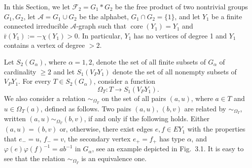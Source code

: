 \documentclass[10pt, reqno]{amsart}
\numberwithin{equation}{section}
\begin{document}
In this Section, we  let ${\mathcal{F}}_2 = G_1 * G_2$ be the free product of two nontrivial  groups  $G_1, G_2$, let
${\mathcal{A}} = G_1 \cup G_2$ be the alphabet,  $G_1 \cap G_2 = \{ 1\}$,  and let $Y_1$ be a finite connected
irreducible  ${\mathcal{A}}$-graph such that  $\operatorname{core}(Y_1) = Y_1$ and ${\bar {\mathrm{r}}}(Y_1) := -\chi(Y_1) >0$.
In particular, $Y_1$ has no vertices of degree 1 and $Y_1$ contains a vertex of degree $>2$.

Let $S_2(G_{\alpha})$, where ${\alpha} =1,2$, denote the set of all finite subsets of $G_{\alpha}$ of cardinality $\ge 2$ and let $S_1(V_P Y_1)$ denote the set of all nonempty subsets of $V_P Y_1$.
For every $T \in S_2(G_{\alpha})$, consider  a function
$$
{\Omega}_T : T \to S_1(V_P Y_1) .
$$
We also consider a relation  ${\sim}_{{\Omega}_T}$  on the  set of all pairs $(a, u)$, where $a \in T$ and $u \in {\Omega}_T(a)$, defined as follows.  Two pairs $(a, u)$, $(b, v)$ are related by ${\sim}_{{\Omega}_T}$,  written $(a, u) {\sim}_{{\Omega}_T} (b, v)$, if and only if the following holds. Either $(a, u) = (b, v)$ or, otherwise,
there exist edges $e, f \in E Y_1$ with the properties that $e_- = u$,  $f_- = v$, the secondary vertex $e_+ = f_+$ has type ${\alpha}$, and ${\varphi}(e){\varphi}(f)^{-1} = ab^{-1}$  in $G_{\alpha}$, see an example depicted in Fig.~3.1.
It is easy to see that the relation  ${\sim}_{{\Omega}_T}$  is an equivalence one.
\end{document}
